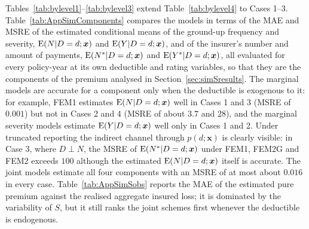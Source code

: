 \documentclass[11pt]{article}
\newcommand{\rev}[1]{{\color{blue}#1}}
\begin{document}




\rev{Tables~\ref{tab:bylevel1}--\ref{tab:bylevel3} extend Table~\ref{tab:bylevel4} to Cases 1--3. Table~\ref{tab:AppSimComponents} compares the models in terms of the MAE and MSRE of the estimated conditional means of the ground-up frequency and severity, ${\rm E}(N|D=d;\bm{x})$ and ${\rm E}(Y|D=d;\bm{x})$, and of the insurer's number and amount of payments, ${\rm E}(N^*|D=d;\bm{x})$ and ${\rm E}(Y^*|D=d;\bm{x})$, all evaluated for every policy-year at its own deductible and rating variables, so that they are the components of the premium analysed in Section~\ref{sec:simSresults}. The marginal models are accurate for a component only when the deductible is exogenous to it: for example, FEM1 estimates ${\rm E}(N|D=d;\bm{x})$ well in Cases 1 and 3 (MSRE of $0.001$) but not in Cases 2 and 4 (MSRE of about $3.7$ and $28$), and the marginal severity models estimate ${\rm E}(Y|D=d;\bm{x})$ well only in Cases 1 and 2. Under truncated reporting the indirect channel through $p(d;\bm{x})$ is clearly visible: in Case 3, where $D\perp N$, the MSRE of ${\rm E}(N^*|D=d;\bm{x})$ under FEM1, FEM2G and FEM2 exceeds $100$ although the estimated ${\rm E}(N|D=d;\bm{x})$ itself is accurate. The joint models estimate all four components with an MSRE of at most about $0.016$ in every case. Table~\ref{tab:AppSimSobs} reports the MAE of the estimated pure premium against the realised aggregate insured loss; it is dominated by the variability of $S$, but it still ranks the joint schemes first whenever the deductible is endogenous.}
\end{document}
